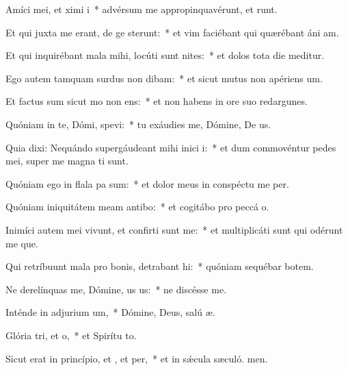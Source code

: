 \item Amíci mei, et ximi i~* advérsum me appropinquavérunt, et runt.
\item Et qui juxta me erant, de ge sterunt:~* et vim faciébant qui quærébant áni am.
\item Et qui inquirébant mala mihi, locúti sunt nites:~* et dolos tota die meditur.
\item Ego autem tamquam surdus non dibam:~* et sicut mutus non apériens  um.
\item Et factus sum sicut mo non ens:~* et non habens in ore suo redargunes.
\item Quóniam in te, Dómi, spevi:~* tu exáudies me, Dómine, De us.
\item Quia dixi: Nequándo supergáudeant mihi inici i:~* et dum commovéntur pedes mei, super me magna ti sunt.
\item Quóniam ego in flala pa sum:~* et dolor meus in conspéctu me per.
\item Quóniam iniquitátem meam antibo:~* et cogitábo pro peccá o.
\item Inimíci autem mei vivunt, et confirti sunt  me:~* et multiplicáti sunt qui odérunt me que.
\item Qui retríbuunt mala pro bonis, detrabant hi:~* quóniam sequébar botem.
\item Ne derelínquas me, Dómine, us us:~* ne discésse  me.
\item Inténde in adjurium um,~* Dómine, Deus, salú æ.
\item Glória tri, et o,~* et Spirítu to.
\item Sicut erat in princípio, et , et per,~* et in sǽcula sæculó. men.
